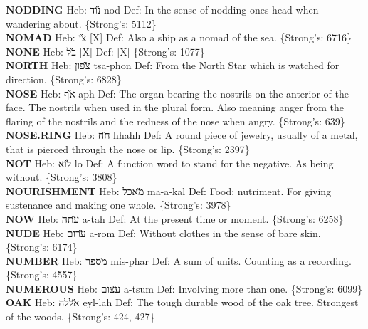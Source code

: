 {\textbf{NODDING} Heb: {\large\H נוד} nod Def: In the sense of nodding ones head when wandering about. \{Strong's: 5112\}\hfill{}\\

\textbf{NOMAD} Heb: {\large\H צי} {[}X{]} Def: Also a ship as a nomad of the sea. \{Strong's: 6716\}\hfill{}\\

\textbf{NONE} Heb: {\large\H בל} {[}X{]} Def: {[}X{]} \{Strong's: 1077\}\hfill{}\\

\textbf{NORTH} Heb: {\large\H צפון} tsa-phon Def: From the North Star which is watched for direction. \{Strong's: 6828\}\hfill{}\\

\textbf{NOSE} Heb: {\large\H אף} aph Def: The organ bearing the nostrils on the anterior of the face. The nostrils when used in the plural form. Also meaning anger from the flaring of the nostrils and the redness of the nose when angry. \{Strong's: 639\}\hfill{}\\

\textbf{NOSE.RING} Heb: {\large\H חח} hhahh Def: A round piece of jewelry, usually of a metal, that is pierced through the nose or lip. \{Strong's: 2397\}\hfill{}\\

\textbf{NOT} Heb: {\large\H לוא} lo Def: A function word to stand for the negative. As being without. \{Strong's: 3808\}\hfill{}\\

\textbf{NOURISHMENT} Heb: {\large\H מאכל} ma-a-kal Def: Food; nutriment. For giving sustenance and making one whole. \{Strong's: 3978\}\hfill{}\\

\textbf{NOW} Heb: {\large\H עתה} a-tah Def: At the present time or moment. \{Strong's: 6258\}\hfill{}\\

\textbf{NUDE} Heb: {\large\H ערום} a-rom Def: Without clothes in the sense of bare skin. \{Strong's: 6174\}\hfill{}\\

\textbf{NUMBER} Heb: {\large\H מספר} mis-phar Def: A sum of units. Counting as a recording. \{Strong's: 4557\}\hfill{}\\

\textbf{NUMEROUS} Heb: {\large\H עצום} a-tsum Def: Involving more than one. \{Strong's: 6099\}\hfill{}\\

\textbf{OAK} Heb: {\large\H אללה} eyl-lah Def: The tough durable wood of the oak tree. Strongest of the woods. \{Strong's: 424, 427\}\hfill{}\\

}
